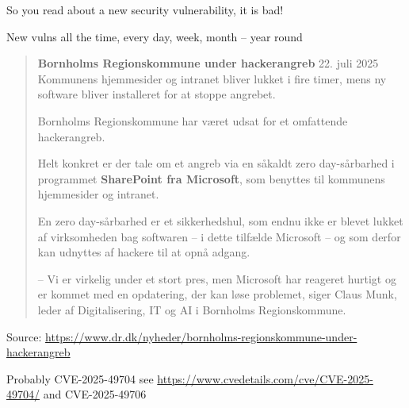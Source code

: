 \documentclass[Screen16to9,17pt]{foils}
\begin{document}

So you read about a new security vulnerability, it is bad!
\begin{list2}
\item New vulns all the time, every day, week, month -- year round
\end{list2}



\begin{quote}
{\bf\large Bornholms Regionskommune under hackerangreb} 22. juli 2025\\
Kommunens hjemmesider og intranet bliver lukket i fire timer, mens ny software bliver installeret for at stoppe angrebet.

Bornholms Regionskommune har været udsat for et omfattende hackerangreb.

Helt konkret er der tale om et angreb via en såkaldt zero day-sårbarhed i programmet {\bf SharePoint fra Microsoft}, som benyttes til kommunens hjemmesider og intranet.

En zero day-sårbarhed er et sikkerhedshul, som endnu ikke er blevet lukket af virksomheden bag softwaren – i dette tilfælde Microsoft – og som derfor kan udnyttes af hackere til at opnå adgang.

– Vi er virkelig under et stort pres, men Microsoft har reageret hurtigt og er kommet med en opdatering, der kan løse problemet, siger Claus Munk, leder af Digitalisering, IT og AI i Bornholms Regionskommune.
\end{quote}
Source: \url{https://www.dr.dk/nyheder/bornholms-regionskommune-under-hackerangreb}
\begin{list2}
\item Probably CVE-2025-49704 see \url{https://www.cvedetails.com/cve/CVE-2025-49704/} and CVE-2025-49706
\end{list2}



\end{document}
